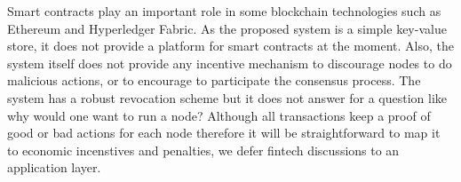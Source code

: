 Smart contracts play an important role in some blockchain technologies
such as Ethereum and Hyperledger Fabric. As the proposed system is a simple
key-value store, it does not provide a platform for smart contracts at
the moment. Also, the system itself does not provide any incentive
mechanism to discourage nodes to do malicious actions, or to encourage
to participate the consensus process. The system has a robust
revocation scheme but it does not answer for a question like why would
one want to run a node? Although all transactions keep a proof of good
or bad actions for each node therefore it will be straightforward to
map it to economic incenstives and penalties, we defer fintech
discussions to an application layer.
